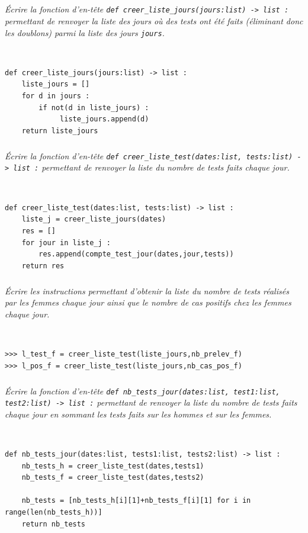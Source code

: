 \documentclass[10pt,fleqn]{article} %
\begin{document}
\subparagraph{}
\textit{Écrire la fonction d’en-tête \texttt{def creer\_liste\_jours(jours:list) -> list :} permettant de renvoyer la liste des jours où des tests ont été faits (éliminant donc les doublons) parmi la liste des jours \texttt{jours}.}
\ifprof
\begin{corrige}~\\
\begin{lstlisting}
def creer_liste_jours(jours:list) -> list :
    liste_jours = []
    for d in jours :
        if not(d in liste_jours) :
             liste_jours.append(d)
    return liste_jours 
\end{lstlisting}
\end{corrige}
\else
\fi


\subparagraph{}
\textit{Écrire la fonction d’en-tête \texttt{def creer\_liste\_test(dates:list, tests:list) -> list :} permettant de renvoyer la liste du nombre de tests faits chaque jour.}
\ifprof
\begin{corrige}~\\
\begin{lstlisting}
def creer_liste_test(dates:list, tests:list) -> list :
    liste_j = creer_liste_jours(dates)
    res = []
    for jour in liste_j :
        res.append(compte_test_jour(dates,jour,tests))
    return res
\end{lstlisting}
\end{corrige}
\else
\fi


\subparagraph{}
\textit{Écrire les instructions permettant d'obtenir la liste du nombre de tests réalisés par les femmes chaque jour ainsi que le nombre de cas positifs chez les femmes chaque jour.}
\ifprof
\begin{corrige}~\\
\begin{lstlisting}
>>> l_test_f = creer_liste_test(liste_jours,nb_prelev_f)
>>> l_pos_f = creer_liste_test(liste_jours,nb_cas_pos_f)
\end{lstlisting}
\end{corrige}
\else
\fi



\subparagraph{}
\textit{Écrire la fonction d’en-tête \texttt{def nb\_tests\_jour(dates:list, test1:list, test2:list) -> list :} permettant de renvoyer la liste du nombre de tests faits chaque jour en sommant les tests faits sur les hommes et sur les femmes.}
\ifprof
\begin{corrige}~\\
\begin{lstlisting}
def nb_tests_jour(dates:list, tests1:list, tests2:list) -> list :
    nb_tests_h = creer_liste_test(dates,tests1)
    nb_tests_f = creer_liste_test(dates,tests2)
    
    nb_tests = [nb_tests_h[i][1]+nb_tests_f[i][1] for i in range(len(nb_tests_h))]
    return nb_tests
\end{lstlisting}
\end{corrige}
\else
\fi
\end{document}
